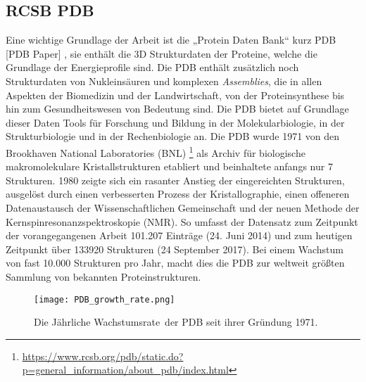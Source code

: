 \subsection{RCSB PDB}

Eine wichtige Grundlage der Arbeit ist die „Protein Daten Bank“ kurz PDB [PDB Paper]
, sie enthält die 3D Strukturdaten der Proteine, welche die Grundlage der Energieprofile sind. Die PDB enthält zusätzlich noch Strukturdaten von Nukleinsäuren und komplexen \emph{Assemblies}, die in allen Aspekten der Biomedizin und der Landwirtschaft, von der Proteinsynthese bis hin zum Gesundheitswesen von Bedeutung sind. Die PDB bietet auf Grundlage dieser Daten Tools für Forschung und Bildung in der Molekularbiologie, in der Strukturbiologie und in der Rechenbiologie an.
Die PDB wurde 1971 von den Brookhaven National Laboratories (BNL) \footnote{\url{https://www.rcsb.org/pdb/static.do?p=general_information/about_pdb/index.html}} als Archiv für biologische makromolekulare Kristallstrukturen etabliert und beinhaltete anfangs nur 7 Strukturen. 1980 zeigte sich ein rasanter Anstieg der eingereichten Strukturen, ausgelöst durch einen verbesserten Prozess der Kristallographie, einen offeneren Datenaustausch der Wissenschaftlichen Gemeinschaft und der neuen Methode der Kernspinresonanzspektroskopie (NMR). So umfasst der Datensatz zum Zeitpunkt der vorangegangenen Arbeit 101.207 Einträge (24. Juni 2014) und zum heutigen Zeitpunkt über 133920 Strukturen (24 September 2017). Bei einem Wachstum von fast 10.000 Strukturen pro Jahr, macht dies die PDB zur weltweit größten Sammlung von bekannten Proteinstrukturen.

\begin{figure}
\texttt{[image: PDB\_growth\_rate.png]}
\caption[Caption for LOF]{Die Jährliche Wachstumsrate\protect\footnotemark \ der PDB seit ihrer Gründung 1971.}
\label{fig:PDB_growth_rate}
\end{figure}


